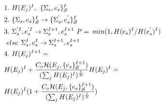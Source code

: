 \documentclass[aps,prl,reprint,superscriptaddress,showkeys]{revtex4-1}
\begin{document}
\begin{equation}
\begin{split}
&1.\hspace{0.125cm} H(E_j)^I ,\hspace{0.15cm}  \{\Sigma_{s},e_s\}_{\mathcal{S}}^I\\
&2. \hspace{0.125cm}\{\Sigma_{s},e_s\}_{\mathcal{S}}^I \rightarrow  \{\Sigma_{s}^{'},e_s^{'}\}_{\mathcal{S}}^I\\
&3. \hspace{0.125cm} \Sigma_{s}^{'I}, e_s^{'I} \rightarrow \Sigma_{s}^{I+1},e_s^{I+1}   \hspace{0.125cm} P = \hspace{0.075cm} min (1, H(e_s)^{I}/H(e_s^{'})^{I})\\
& \hspace{0.125cm}else  \hspace{0.15cm} \Sigma_{s}^I, e_s^I \rightarrow \Sigma_{s}^{I+1}, e_s^{I+1}\\
&4. \hspace{0.125cm} H(E_j)^{I+1} =  \\
& H(E_j)^{I} + \frac{C_o \mathcal{H}(E_j,\{e_s\}_{\mathcal{S}}^{I+1}) }{ (\sum_j H(E_j)^{I})^{\frac{1}{N} } }H(E_j)^{I} = \\
& H(E_j)^{I}( 1 +  \frac{C_o \mathcal{H}(E_j,\{e_s\}_{\mathcal{S}}^{I+1}) }{ (\sum_j H(E_j)^{I})^{\frac{1}{N} } } )\\
\end{split}
\label{blender}
\end{equation}
\end{document}
